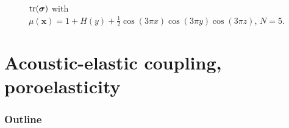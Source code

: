 \documentclass[compress]{beamer}
\begin{document}
{\begin{figure}
\begin{overlayarea}{\textwidth}{.75\textheight}
{}
\end{overlayarea}
\caption{${\rm tr}(\bm{\sigma})$ with $\mu(\bm{x}) = 1+ H(y) + \frac{1}{2}\cos(3\pi x)\cos(3\pi y)\cos(3\pi z)$, $N=5$.}
\end{figure}
}

\section{Acoustic-elastic coupling, poroelasticity}

\begin{frame}[noframenumbering]
    \frametitle{Outline}
    \tableofcontents[currentsection]
\end{frame}
\end{document}
